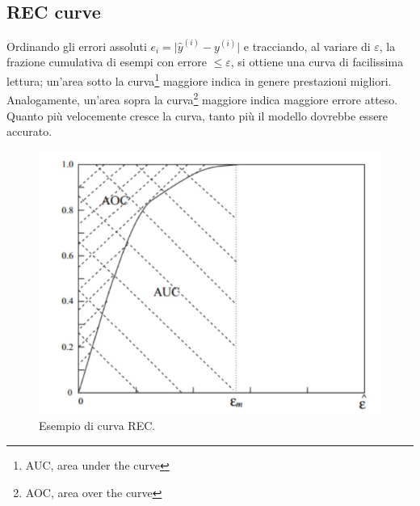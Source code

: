 \subsection{REC curve}
Ordinando gli errori assoluti \(e_i=\lvert \hat y^{(i)}-y^{(i)}\rvert\) e
tracciando, al variare di \(\varepsilon\), la frazione cumulativa di esempi con errore
\(\le\varepsilon\), si ottiene una curva di facilissima lettura; un’area sotto la curva\footnote{AUC, area under the curve} maggiore indica in genere prestazioni migliori. Analogamente, un'area sopra la curva\footnote{AOC, area over the curve} maggiore indica maggiore errore atteso. Quanto più velocemente cresce la curva, tanto più il modello dovrebbe essere accurato.

\begin{figure}[tbph]
	\centering
	\includegraphics[width=0.7\linewidth]{./images/REC-curve}
	\caption{Esempio di curva REC.}
	\label{fig:rec-curve}
\end{figure}
